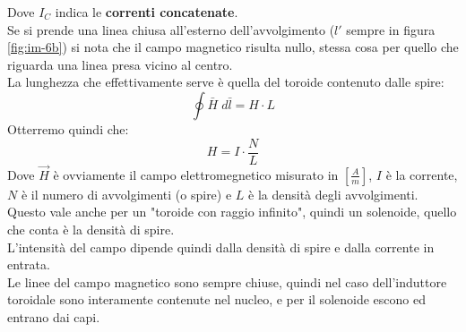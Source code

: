 \documentclass[../main.tex]{subfiles}
\begin{document}
	Dove $I_C$ indica le \textbf{correnti concatenate}.\\
	Se si prende una linea chiusa all’esterno dell’avvolgimento ($l'$ sempre in figura  \ref{fig:im-6b}) si nota che il campo magnetico risulta nullo, stessa cosa per quello che riguarda una linea presa vicino al centro. \\
	La lunghezza che eﬀettivamente serve è quella del toroide contenuto dalle spire:
	\begin{equation}
		\oint \bar{H} \; d\bar{l} = H \cdot L
	\end{equation}
	Otterremo quindi che:
	\begin{equation}
		H = I \cdot \frac{N}{L}
	\end{equation}
	Dove $\overrightarrow{H}$ è ovviamente il campo elettromegnetico misurato in $\left[ \frac{A}{m} \right]$, $I$ è la corrente, $N$ è il numero di avvolgimenti (o spire) e $L$ è la densità degli avvolgimenti.\\
	Questo vale anche per un "toroide con raggio infinito", quindi un solenoide, quello che conta è la densità di spire.\\
	L’intensità del campo dipende quindi dalla densità di spire e dalla corrente in entrata.\\
	Le linee del campo magnetico sono sempre chiuse, quindi nel caso dell’induttore toroidale sono interamente contenute nel nucleo, e per il solenoide escono ed entrano dai capi.
\end{document}
